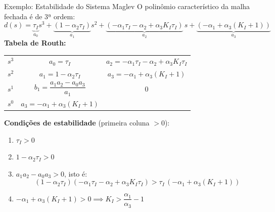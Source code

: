 \begin{frame}{Exemplo: Estabilidade do Sistema Maglev}
  \scriptsize
  O polinômio característico da malha fechada é de 3ª ordem:
  \begin{equation*}
    d(s) = \underbrace{\tau_I}_{a_0} s^3
    + \underbrace{(1 - \alpha_2\tau_I)}_{a_1} s^2
    + \underbrace{(-\alpha_1\tau_I - \alpha_2 + \alpha_3 K_I\tau_I)}_{a_2}\, s
    + \underbrace{(-\alpha_1 + \alpha_3(K_I+1))}_{a_3}
  \end{equation*}
  \textbf{Tabela de Routh:}
  \begin{center}
    \begin{tabular}{c|cc}
      $s^3$ & $a_0 = \tau_I$ & $a_2 = -\alpha_1\tau_I - \alpha_2 + \alpha_3 K_I\tau_I$ \\
      $s^2$ & $a_1 = 1-\alpha_2\tau_I$ & $a_3 = -\alpha_1+\alpha_3(K_I+1)$ \\
      $s^1$ & $b_1 = \dfrac{a_1 a_2 - a_0 a_3}{a_1}$ & $0$ \\
      $s^0$ & $a_3 = -\alpha_1 + \alpha_3(K_I+1)$ & \\
    \end{tabular}
  \end{center}
  \textbf{Condições de estabilidade} (primeira coluna $> 0$):
  \begin{enumerate}
    \item $\tau_I > 0$
    \item $1 - \alpha_2\tau_I > 0$
    \item $a_1 a_2 - a_0 a_3 > 0$, isto é:
      \begin{equation*}
        (1-\alpha_2\tau_I)(-\alpha_1\tau_I - \alpha_2 + \alpha_3 K_I\tau_I)
        > \tau_I\,(-\alpha_1 + \alpha_3(K_I+1))
      \end{equation*}
    \item $-\alpha_1 + \alpha_3(K_I+1) > 0 \implies K_I > \dfrac{\alpha_1}{\alpha_3} - 1$
  \end{enumerate}
\end{frame}

